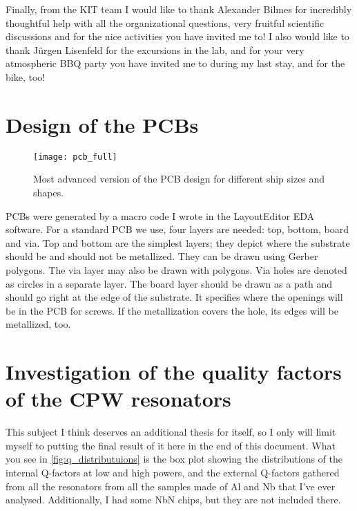 \documentclass[12pt, twoside]{report}
\renewcommand*\thesection{\arabic{section}}
\numberwithin{equation}{section}
\renewcommand*\thesection{\arabic{chapter}.\arabic{section}}
\begin{document}
Finally, from the KIT team I would like to thank Alexander Bilmes for incredibly thoughtful help with all the organizational questions, very fruitful scientific discussions and for the nice activities you have invited me to! I also would like to thank Jürgen Lisenfeld for the excursions in the lab, and for your very atmospheric BBQ party you have invited me to during my last stay, and for the bike, too!




\appendix
\renewcommand*\thesection{\Alph{chapter}.\arabic{section}}






\chapter{Design of the PCBs}

\begin{figure}[h!]
\texttt{[image: pcb\_full]}
\caption{Most advanced version of the PCB design for different ship sizes and shapes.}
\end{figure}

PCBs were generated by a macro code I wrote in the LayoutEditor EDA software. For a standard PCB we use, four layers are needed: top, bottom, board and via. Top and bottom are the simplest layers; they depict where the substrate should be and should not be metallized. They can be drawn using Gerber polygons. The via layer may also be drawn with polygons. Via holes are denoted as circles in a separate layer. The board layer should be drawn as a path and should go right at the edge of the substrate. It specifies where the openings will be in the PCB for screws. If the metallization covers the hole, its edges will be metallized, too.


\chapter{Investigation of the quality factors of the CPW resonators}

This subject I think deserves an additional thesis for itself, so I only will limit myself to putting the final result of it here in the end of this document. What you see in \autoref{fig:q_distributuions} is the box plot showing the distributions of the internal Q-factors at low and high powers, and the external Q-factors gathered from all the resonators from all the samples made of Al and Nb that I've ever analysed. Additionally, I had some NbN chips, but they are not included there. 
\end{document}
